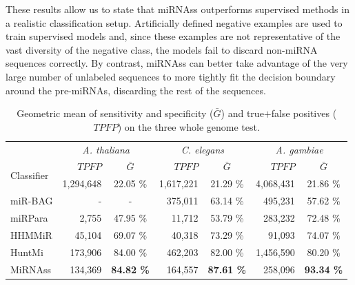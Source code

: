 \documentclass{article}
\begin{document}
These results allow us to state that miRNAss outperforms supervised methods in a realistic classification setup. 
Artificially defined negative examples are used to train supervised models and, since these examples are not representative of the vast diversity of the negative class, the models fail to discard non-miRNA sequences correctly. By contrast, miRNAss can better take advantage of the very large number of unlabeled sequences to more tightly fit the decision boundary around the pre-miRNAs, discarding the rest of the sequences.
\begin{table}[tpb]
	\centering
	\caption{Geometric mean of sensitivity and specificity ($\bar{G}$) and true$+$false positives ($TPFP$) on the three whole genome test. \label{tab:wholegenome}}
	\begin{tabular}{@{}lrcrcrc@{}} \toprule
		&	\multicolumn{2}{c}{\textit{A. thaliana}}
		&	\multicolumn{2}{c}{\textit{C. elegans}}
		&	\multicolumn{2}{c}{\textit{A. gambiae}} \\
		\multirow{2}{*}{Classifier}	&	 $TPFP$		&	 $\bar{G}$
						&	 $TPFP$			&	 $\bar{G}$
						&	 $TPFP$			&	 $\bar{G}$	\\\midrule
		{\small Mirident}	&	 1,294,648		&	 22.05 \%
					&	 1,617,221		&	 21.29 \%
					&	 4,068,431		&	 21.86 \%	\\
		{\small miR-BAG}	&	 -			&	 -
					&	 375,011		&	 63.14 \%
					&	 495,231		&	 57.62 \%	\\
		{\small miRPara}	&	 2,755			&	 47.95 \%
					&	 11,712			&	 53.79 \%
					&	 283,232		&	 72.48 \%	\\
		{\small HHMMiR}		&	 45,104			&	 69.07 \%
					&	 40,318			&	 73.29 \%
					&	 91,093			&	 74.07 \%	\\
		{\small HuntMi}		&	 173,906		&	 84.00 \%
					&	 462,203		&	 82.00 \%
					&	 1,456,590		&	 80.20 \%	\\
		{\small MiRNAss}	&	 134,369		&	 \textbf{84.82 \%}
					&	 164,557		&	 \textbf{87.61 \%}
					&	 258,096		&	 \textbf{93.34 \%}	\\\bottomrule
	\end{tabular}
\end{table}
\end{document}
